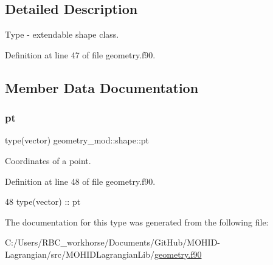 \subsection{Detailed Description}
Type -\/ extendable shape class. 

Definition at line 47 of file geometry.\+f90.



\subsection{Member Data Documentation}
\mbox{\label{structgeometry__mod_1_1shape_a4c7824c0af103efbef53cbcacb9a5de0}} 
\subsubsection{\texorpdfstring{pt}{pt}}
{\footnotesize\ttfamily type(vector) geometry\+\_\+mod\+::shape\+::pt\hspace{0.3cm}{\ttfamily [private]}}



Coordinates of a point. 



Definition at line 48 of file geometry.\+f90.


\begin{DoxyCode}
48         \textcolor{keywordtype}{type}(vector) :: pt
\end{DoxyCode}


The documentation for this type was generated from the following file\+:\begin{DoxyCompactItemize}
\item 
C\+:/\+Users/\+R\+B\+C\+\_\+workhorse/\+Documents/\+Git\+Hub/\+M\+O\+H\+I\+D-\/\+Lagrangian/src/\+M\+O\+H\+I\+D\+Lagrangian\+Lib/\mbox{\hyperlink{geometry_8f90}{geometry.\+f90}}\end{DoxyCompactItemize}
